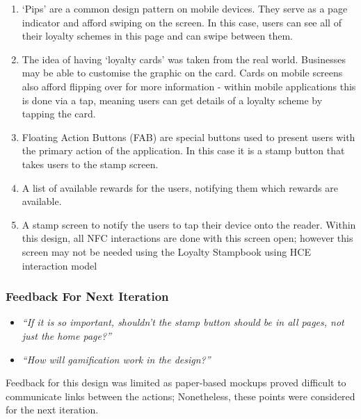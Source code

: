\begin{enumerate}
  \item `Pips' are a common design pattern on mobile devices. They serve as a page indicator and afford swiping on the screen. In this case, users can see all of their loyalty schemes in this page and can swipe between them. 
  \item The idea of having `loyalty cards' was taken from the real world. Businesses may be able to customise the graphic on the card.  Cards on mobile screens also afford flipping over for more information - within mobile applications this is done via a tap, meaning users can get details of a loyalty scheme by tapping the card.  
  \item Floating Action Buttons (FAB) are special buttons used to present users with the primary action of the application. In this case it is a stamp button that takes users to the stamp screen.
  \item A list of available rewards for the users, notifying them which rewards are available.
  \item A stamp screen to notify the users to tap their device onto the reader. Within this design, all NFC interactions are done with this screen open; however this screen may not be needed using the Loyalty Stampbook using HCE interaction model
\end{enumerate}

\subsubsection{Feedback For Next Iteration}
\begin{itemize}
  \item \textit{``If it is so important, shouldn't the stamp button should be in all pages, not just the home page?''}
  \item \textit{``How will gamification work in the design?''}
\end{itemize}

Feedback for this design was limited as paper-based mockups proved difficult to communicate links between the actions; Nonetheless, these points were considered for the next iteration.


